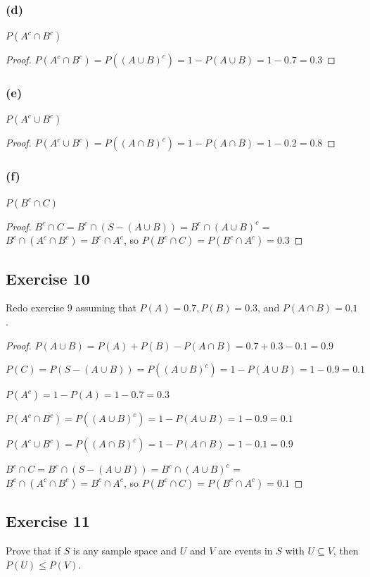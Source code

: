 \documentclass[14pt]{extarticle}
\begin{document}
\subsubsection{(d)}
\(P(A^c \cap B^c)\)
\begin{proof}
\(P(A^c \cap B^c) = P((A \cup B)^c) = 1 - P(A \cup B) = 1 - 0.7 = 0.3\)
\end{proof}

\subsubsection{(e)}
\(P(A^c \cup B^c)\)
\begin{proof}
\(P(A^c \cup B^c) = P((A \cap B)^c) = 1 - P(A \cap B) = 1 - 0.2 = 0.8\)
\end{proof}

\subsubsection{(f)}
\(P(B^c \cap C)\)
\begin{proof}
\(B^c \cap C = B^c \cap (S - (A \cup B)) = B^c \cap (A \cup B)^c\) = \(B^c \cap (A^c \cap B^c) = B^c \cap A^c\), so \(P(B^c \cap C) = P(B^c \cap A^c) = 0.3\)
\end{proof}

\subsection{Exercise 10}
Redo exercise 9 assuming that \(P(A) = 0.7, P(B) = 0.3\), and \(P(A \cap B) = 0.1\).

\begin{proof}
\(P(A \cup B) = P(A) + P(B) - P(A \cap B) = 0.7 + 0.3 - 0.1 = 0.9\)

\(P(C) = P(S - (A \cup B)) = P((A \cup B)^c) = 1 - P(A \cup B) = 1 - 0.9 = 0.1\)

\(P(A^c) = 1 - P(A) = 1 - 0.7 = 0.3\)

\(P(A^c \cap B^c) = P((A \cup B)^c) = 1 - P(A \cup B) = 1 - 0.9 = 0.1\)

\(P(A^c \cup B^c) = P((A \cap B)^c) = 1 - P(A \cap B) = 1 - 0.1 = 0.9\)

\(B^c \cap C = B^c \cap (S - (A \cup B)) = B^c \cap (A \cup B)^c\) = \(B^c \cap (A^c \cap B^c) = B^c \cap A^c\), so \(P(B^c \cap C) = P(B^c \cap A^c) = 0.1\)
\end{proof}

\subsection{Exercise 11}
Prove that if \(S\) is any sample space and \(U\) and \(V\) are events in \(S\) with \(U \subseteq V\), then \(P(U) \leq 
P(V)\).
\end{document}
